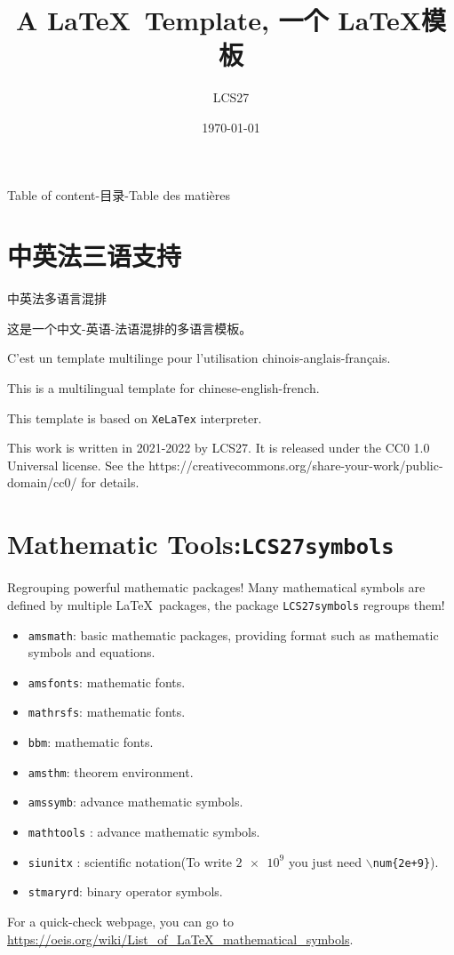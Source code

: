 \documentclass[aspectratio=169]{beamer}
\title{A \LaTeX \ Template, 一个 \LaTeX 模板}
\author{LCS27}
\institute{Overleaf模板作者}
\date{\today}
\begin{document}
\maketitle

\begin{frame}{Table of content-目录-Table des matières}
\tableofcontents
\end{frame}
\section{中英法三语支持}
\begin{frame}{中英法}{多语言混排}

这是一个中文-英语-法语混排的多语言模板。\par
C'est un template multilinge pour l'utilisation chinois-anglais-français.\par
This is a multilingual template for chinese-english-french.\par
\par
This template is based on \texttt{XeLaTex} interpreter.\par
This work is written in 2021-2022 by LCS27. It is released under the CC0 1.0 Universal license. See the https://creativecommons.org/share-your-work/public-domain/cc0/ for details.\par
\end{frame}


\section{Mathematic Tools:\texttt{LCS27symbols}}

\begin{frame}{Regrouping powerful mathematic packages!}
Many mathematical symbols are defined by multiple \LaTeX \ packages, the package \texttt{LCS27symbols} regroups them!
\begin{itemize}
\item  \texttt{amsmath}: basic mathematic packages, providing format such as mathematic symbols and equations.
\item  \texttt{amsfonts}: mathematic fonts.
\item  \texttt{mathrsfs}: mathematic fonts.
\item  \texttt{bbm}: mathematic fonts.
\item  \texttt{amsthm}: theorem environment.
\item  \texttt{amssymb}: advance mathematic symbols.
\item  \texttt{mathtools} : advance mathematic symbols.
\item  \texttt{siunitx} : scientific notation(\Eg  To write $\num{2e+9}$ you just need \texttt{$\backslash$num\{2e+9\}}).
\item  \texttt{stmaryrd}: binary operator symbols.
\end{itemize}
For a quick-check webpage, you can go to \url{https://oeis.org/wiki/List_of_LaTeX_mathematical_symbols}.
\end{frame}
\end{document}
